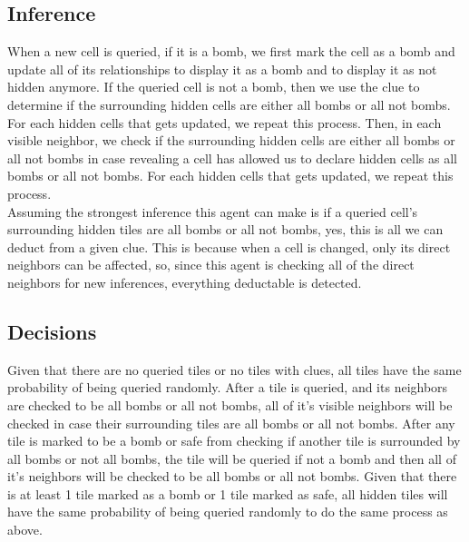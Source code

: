 \documentclass[13pt]{report}
\begin{document}
\subsection*{Inference}
When a new cell is queried, if it is a bomb, we first mark the cell as a bomb and update all of its relationships to display it as a bomb and to display it as not hidden anymore. If the queried cell is not a bomb, then we use the clue to determine if the surrounding hidden cells are either all bombs or all not bombs. For each hidden cells that gets updated, we repeat this process. Then, in each visible neighbor, we check if the surrounding hidden cells are either all bombs or all not bombs in case revealing a cell has allowed us to declare hidden cells as all bombs or all not bombs. For each hidden cells that gets updated, we repeat this process.\\
Assuming the strongest inference this agent can make is if a queried cell's surrounding hidden tiles are all bombs or all not bombs, yes, this is all we can deduct from a given clue. This is because when a cell is changed, only its direct neighbors can be affected, so, since this agent is checking all of the direct neighbors for new inferences, everything deductable is detected.

\subsection*{Decisions}
Given that there are no queried tiles or no tiles with clues, all tiles have the same probability of being queried randomly. After a tile is queried, and its neighbors are checked to be all bombs or all not bombs, all of it's visible neighbors will be checked in case their surrounding tiles are all bombs or all not bombs. After any tile is marked to be a bomb or safe from checking if another tile is surrounded by all bombs or not all bombs, the tile will be queried if not a bomb and then all of it's neighbors will be checked to be all bombs or all not bombs. Given that there is at least 1 tile marked as a bomb or 1 tile marked as safe, all hidden tiles will have the same probability of being queried randomly to do the same process as above.
\end{document}
